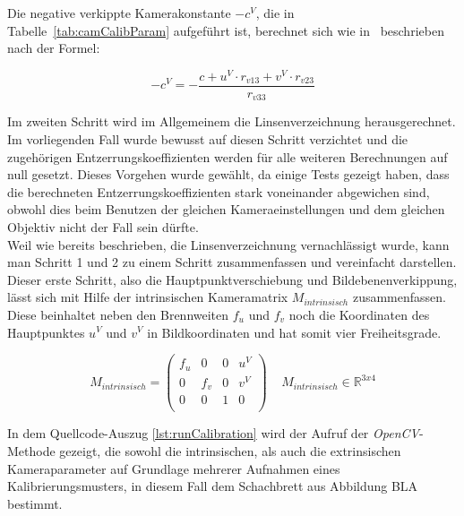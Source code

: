 Die negative verkippte Kamerakonstante $-c^V$, die in Tabelle~\ref{tab:camCalibParam} aufgeführt ist, berechnet sich wie in~\citep{Meisel:77890} beschrieben nach der Formel:

\begin{equation}
-c^V = - \frac{c+u^V \cdot r_{v13} + v^V \cdot r_{v23}}{r_{v33}}
\end{equation}

Im zweiten Schritt wird im Allgemeinem die Linsenverzeichnung herausgerechnet. Im vorliegenden Fall wurde bewusst auf diesen Schritt verzichtet und die zugehörigen Entzerrungskoeffizienten werden für alle weiteren Berechnungen auf null gesetzt. Dieses Vorgehen wurde gewählt, da einige Tests gezeigt haben, dass die berechneten Entzerrungskoeffizienten stark voneinander abgewichen sind, obwohl dies beim Benutzen der gleichen Kameraeinstellungen und dem gleichen Objektiv nicht der Fall sein dürfte.\\
Weil wie bereits beschrieben, die Linsenverzeichnung vernachlässigt wurde, kann man Schritt 1 und 2 zu einem Schritt zusammenfassen und vereinfacht darstellen. Dieser erste Schritt, also die Hauptpunktverschiebung und Bildebenenverkippung, lässt sich mit Hilfe der intrinsischen Kameramatrix $M_{intrinsisch}$ zusammenfassen. Diese beinhaltet neben den Brennweiten $f_u$ und $f_v$ noch die Koordinaten des Hauptpunktes $u^V$ und $v^V$ in Bildkoordinaten und hat somit vier Freiheitsgrade.

\begin{equation}
\label{equ:intrinsic}
M_{intrinsisch} = 
\begin{pmatrix}
f_u & 0 & 0 & u^V \\
0 & f_v & 0 & v^V\\
0 & 0 & 1 & 0 \\
\end{pmatrix} 
~ ~ ~ ~ ~M_{intrinsisch} \in \mathbb{R}^{3x4}
\end{equation}

 

In dem Quellcode-Auszug \ref{lst:runCalibration} wird der Aufruf der \textit{OpenCV}-Methode \texttt{} gezeigt, die sowohl die intrinsischen, als auch die extrinsischen Kameraparameter auf Grundlage mehrerer Aufnahmen eines Kalibrierungsmusters, in diesem Fall dem Schachbrett aus Abbildung BLA bestimmt.  



